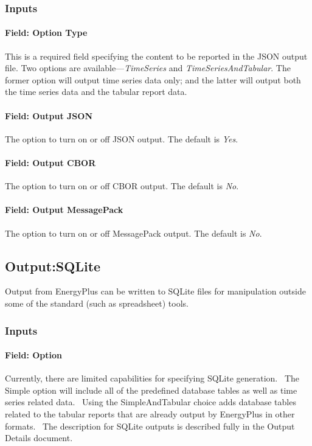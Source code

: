 \subsubsection{Inputs}

\paragraph{Field: Option Type}
This is a required field specifying the content to be reported in the JSON output file. Two options are available---\emph{TimeSeries} and \emph{TimeSeriesAndTabular}. The former option will output time series data only; and the latter will output both the time series data and the tabular report data.

\paragraph{Field: Output JSON}
The option to turn on or off JSON output. The default is \emph{Yes}.

\paragraph{Field: Output CBOR}
The option to turn on or off CBOR output. The default is \emph{No}.

\paragraph{Field: Output MessagePack}
The option to turn on or off MessagePack output. The default is \emph{No}.

\subsection{Output:SQLite}\label{outputsqlite}

Output from EnergyPlus can be written to SQLite files for manipulation outside some of the standard (such as spreadsheet) tools.

\subsubsection{Inputs}\label{inputs-12-014}

\paragraph{Field: Option}\label{field-option}

Currently, there are limited capabilities for specifying SQLite generation.~ The Simple option will include all of the predefined database tables as well as time series related data.~ Using the SimpleAndTabular choice adds database tables related to the tabular reports that are already output by EnergyPlus in other formats.~ The description for SQLite outputs is described fully in the Output Details document.

